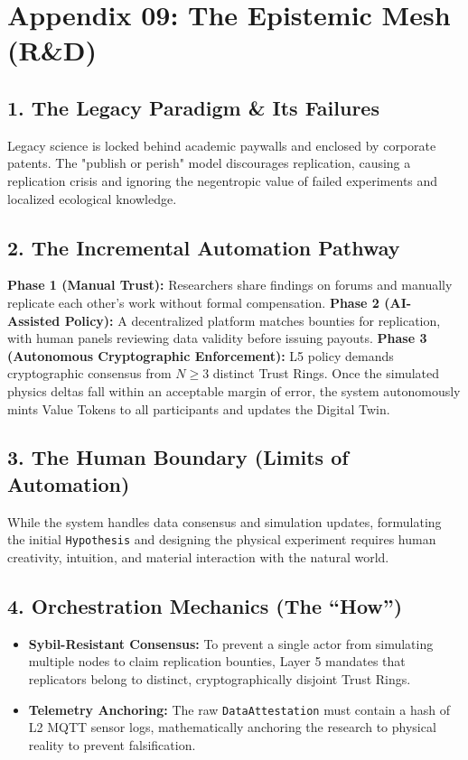 \chapter*{Appendix 09: The Epistemic Mesh (R\&D)}

\section*{1. The Legacy Paradigm \& Its Failures}
Legacy science is locked behind academic paywalls and enclosed by corporate patents. The "publish or perish" model discourages replication, causing a replication crisis and ignoring the negentropic value of failed experiments and localized ecological knowledge.

\section*{2. The Incremental Automation Pathway}
\textbf{Phase 1 (Manual Trust):} Researchers share findings on forums and manually replicate each other's work without formal compensation.
\textbf{Phase 2 (AI-Assisted Policy):} A decentralized platform matches bounties for replication, with human panels reviewing data validity before issuing payouts.
\textbf{Phase 3 (Autonomous Cryptographic Enforcement):} L5 policy demands cryptographic consensus from $N \ge 3$ distinct Trust Rings. Once the simulated physics deltas fall within an acceptable margin of error, the system autonomously mints Value Tokens to all participants and updates the Digital Twin.

\section*{3. The Human Boundary (Limits of Automation)}
While the system handles data consensus and simulation updates, formulating the initial \texttt{Hypothesis} and designing the physical experiment requires human creativity, intuition, and material interaction with the natural world.

\section*{4. Orchestration Mechanics (The ``How'')}
\begin{itemize}
    \item \textbf{Sybil-Resistant Consensus:} To prevent a single actor from simulating multiple nodes to claim replication bounties, Layer 5 mandates that replicators belong to distinct, cryptographically disjoint Trust Rings.
    \item \textbf{Telemetry Anchoring:} The raw \texttt{DataAttestation} must contain a hash of L2 MQTT sensor logs, mathematically anchoring the research to physical reality to prevent falsification.
\end{itemize}
